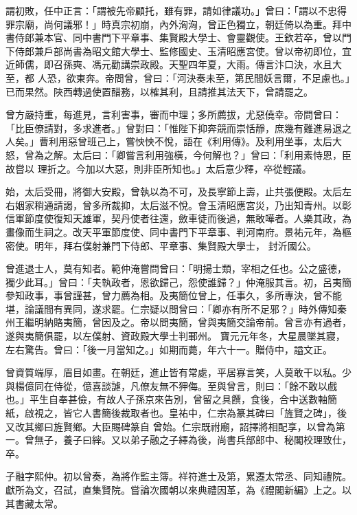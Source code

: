 \begin{pinyinscope}
 謂初敗，任中正言：「謂被先帝顧托，雖有罪，請如律議功。」曾曰：「謂以不忠得罪宗廟，尚何議邪！」時真宗初崩，內外洶洶，曾正色獨立，朝廷倚以為重。拜中書侍郎兼本官、同中書門下平章事、集賢殿大學士、會靈觀使。王欽若卒，曾以門下侍郎兼戶部尚書為昭文館大學士、監修國史、玉清昭應宮使。曾以帝初即位，宜近師儒，即召孫奭、馮元勸講崇政殿。天聖四年夏，大雨。傳言汴口決，水且大至，都
 人恐，欲東奔。帝問曾，曾曰：「河決奏未至，第民間妖言爾，不足慮也。」已而果然。陜西轉過使置醋務，以榷其利，且請推其法天下，曾請罷之。



 曾方嚴持重，每進見，言利害事，審而中理；多所薦拔，尤惡僥幸。帝問曾曰：「比臣僚請對，多求進者。」曾對曰：「惟陛下抑奔競而崇恬靜，庶幾有難進易退之人矣。」曹利用惡曾班己上，嘗怏怏不悅，語在《利用傳》。及利用坐事，太后大怒，曾為之解。太后曰：「卿嘗言利用強橫，今何解也？」曾曰：「利用素恃恩，臣故嘗以
 理折之。今加以大惡，則非臣所知也。」太后意少釋，卒從輕議。



 始，太后受冊，將御大安殿，曾執以為不可，及長寧節上壽，止共張便殿。太后左右姻家稍通請謁，曾多所裁抑，太后滋不悅。會玉清昭應宮災，乃出知青州。以彰信軍節度使復知天雄軍，契丹使者往還，斂車徒而後過，無敢嘩者。人樂其政，為畫像而生祠之。改天平軍節度使、同中書門下平章事、判河南府。景祐元年，為樞密使。明年，拜右僕射兼門下侍郎、平章事、集賢殿大學士，
 封沂國公。



 曾進退士人，莫有知者。範仲淹嘗問曾曰：「明揚士類，宰相之任也。公之盛德，獨少此耳。」曾曰：「夫執政者，恩欲歸己，怨使誰歸？」仲淹服其言。初，呂夷簡參知政事，事曾謹甚，曾力薦為相。及夷簡位曾上，任事久，多所專決，曾不能堪，論議間有異同，遂求罷。仁宗疑以問曾曰：「卿亦有所不足邪？」時外傳知秦州王繼明納賂夷簡，曾因及之。帝以問夷簡，曾與夷簡交論帝前。曾言亦有過者，遂與夷簡俱罷，以左僕射、資政殿大學士判鄆州。
 寶元元年冬，大星晨墜其寢，左右驚告。曾曰：「後一月當知之。」如期而薨，年六十一。贈侍中，謚文正。



 曾資質端厚，眉目如畫。在朝廷，進止皆有常處，平居寡言笑，人莫敢干以私。少與楊億同在侍從，億喜談謔，凡僚友無不狎侮。至與曾言，則曰：「餘不敢以戲也。」平生自奉甚儉，有故人子孫京來告別，曾留之具饌，食後，合中送數軸簡紙，啟視之，皆它人書簡後裁取者也。皇祐中，仁宗為篆其碑曰「旌賢之碑」，後又改其鄉曰旌賢鄉。大臣賜碑篆自
 曾始。仁宗既祔廟，詔擇將相配享，以曾為第一。曾無子，養子曰縡。又以弟子融之子繹為後，尚書兵部郎中、秘閣校理致仕，卒。



 子融字熙仲。初以曾奏，為將作監主簿。祥符進士及第，累遷太常丞、同知禮院。獻所為文，召試，直集賢院。嘗論次國朝以來典禮因革，為《禮閣新編》上之。以其書藏太常。




\end{pinyinscope}
